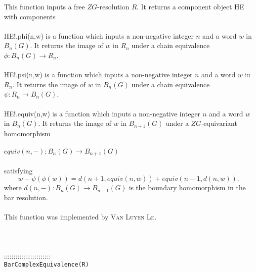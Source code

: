 \documentclass[a4paper,11pt]{report}
\begin{document}
{ This function inputs a free $ZG$-resolution $R$. It returns a component object HE with components \\
 \\
 HE!.phi(n,w) is a function which inputs a non-negative integer $n$ and a word $w$ in $B_n(G)$. It returns the image of $w$ in $R_n$ under a chain equivalence $\phi\colon B_n(G) \rightarrow R_n$.\\
 \\
 HE!.psi(n,w) is a function which inputs a non-negative integer $n$ and a word $w$ in $R_n$. It returns the image of $w$ in $B_n(G)$ under a chain equivalence $\psi\colon R_n \rightarrow B_n(G)$.\\
 \\
 HE!.equiv(n,w) is a function which inputs a non-negative integer $n$ and a word $w$ in $B_n(G)$. It returns the image of $w$ in $B_{n+1}(G)$ under a $ZG$-equivariant homomorphism \\
 \\
 $equiv(n,-) \colon B_n(G) \rightarrow B_{n+1}(G)$ \\
 \\
 satisfying 
\[w - \psi ( \phi (w)) = d(n+1, equiv(n,w)) + equiv(n-1,d(n,w)) . \]
 where $d(n,-)\colon B_n(G) \rightarrow B_{n-1}(G)$ is the boundary homomorphism in the bar resolution. \\
 \\
 This function was implemented by \textsc{Van Luyen Le}. \\
 \\
 \\
 \\
 ::::::::::::::::::::::::\\
 \texttt{BarComplexEquivalence(R)}\\
 

}
\end{document}
